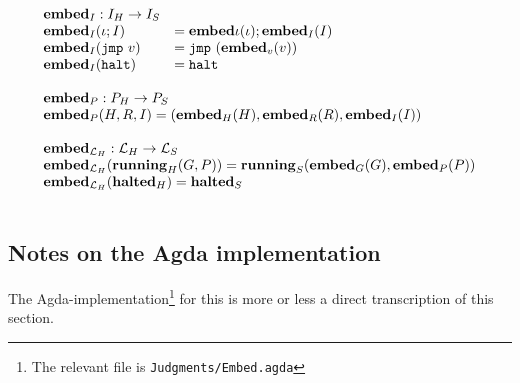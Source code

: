{\[\begin{array}{l}
\begin{array}{ll}
{\ensuremath{\mathbf{embed}}}_I : {I_H} -> {I_S} \\
{\mathbf{embed}}_I(\iota ; I) &= {\mathbf{embed}}{\iota}(\iota) ; {\mathbf{embed}}_I(I) \\
{\mathbf{embed}}_I(\mathtt{jmp}\ v) &= \mathtt{jmp}\ ({\mathbf{embed}}_v(v)) \\
{\mathbf{embed}}_I(\mathtt{halt}) &= \mathtt{halt}
\end{array} \\\\

\begin{array}{l}
{\ensuremath{\mathbf{embed}}}_P : {P_H} -> {P_S} \\
{\mathbf{embed}}_P(H, R, I) = ({\mathbf{embed}}_H(H), {\mathbf{embed}}_R(R), {\mathbf{embed}}_I(I)) \\\\

{\mathbf{embed}}_{\mathcal{L}_H} : \mathcal{L}_H -> \mathcal{L}_S \\
{\mathbf{embed}}_{\mathcal{L}_H}({\mathbf{running}_H}(G, P)) = {\mathbf{running}_S}({\mathbf{embed}}_G(G), {\mathbf{embed}}_P(P)) \\
{\mathbf{embed}}_{\mathcal{L}_H}({\mathbf{halted}_H}) = {\mathbf{halted}_S} \\
\end{array} \\\\

\end{array}\]
}

\subsection{Notes on the Agda implementation}

The Agda-implementation\footnote{The relevant file is
  \texttt{Judgments/Embed.agda}} for this is more or less a direct transcription
of this section.
